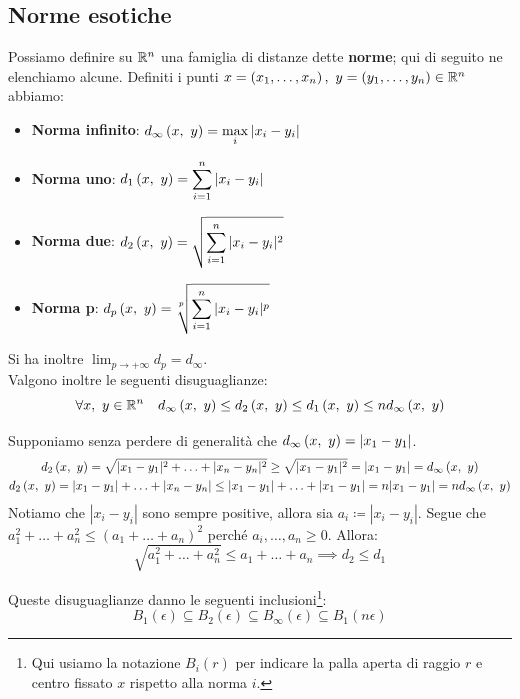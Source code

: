 \subsection{Norme esotiche}
Possiamo definire su $\mathbb{R}^n$ una famiglia di distanze dette \textbf{norme}; qui di seguito ne elenchiamo alcune. Definiti i punti $x=\left(x_1,\ldots, x_n\right),\ y=\left(y_1,\ldots, y_n\right)\in\realset^n$ abbiamo:
\begin{itemize}
\item \textbf{Norma infinito}: $\displaystyle d_\infty\left(x,\ y\right)=\max_{i}{|x_i-y_i|}$
\item \textbf{Norma uno}: $\displaystyle d_1\left(x,\ y\right)=\sum_{i=1}^{n}|x_i-y_i|$
\item \textbf{Norma due}: $\displaystyle d_2\left(x,\ y\right)=\sqrt{\sum_{i=1}^{n}|x_i-y_i|^2}$
\item \textbf{Norma p}: $\displaystyle\mvf{d_p}{x}{y}=\sqrt[\leftroot{1}\uproot{3}p]{\sum_{i=1}^{n}|x_i-y_i|^p}$
\end{itemize}
Si ha inoltre $\displaystyle \lim_{p \to +\infty}d_p=d_\infty$.\\
Valgono inoltre le seguenti disuguaglianze:
\begin{equation}
\forall x,\ y\in\mathbb{R}^n\quad d_\infty\left(x,\ y\right)\leq d_2\left(x,\ y\right)\leq d_1\left(x,\ y\right)\leq nd_\infty\left(x,\ y\right)
\end{equation}
\begin{demonstration}
Supponiamo senza perdere di generalità che $d_\infty\left(x,\ y\right)=|x_1-y_1|$.
\begin{gather*}
d_2\left(x,\ y\right)=\sqrt{|x_1-y_1|^2+\ldots+|x_n-y_n|^2}\geq\sqrt{|x_1-y_1|^2}=|x_1-y_1|=d_\infty\left(x,\ y\right)\\
d_2\left(x,\ y\right)=|x_1-y_1|+\ldots+|x_n-y_n|\leq|x_1-y_1|+\ldots+|x_1-y_1|=n|x_1-y_1|=nd_\infty\left(x,\ y\right)
\end{gather*}
Notiamo che $|x_i-y_i|$ sono sempre positive, allora sia $a_i\coloneqq|x_i-y_i|$. Segue che $a_1^2+\ldots+a_n^2\leq (a_1+\ldots+a_n)^2$ perché $a_i,\ldots,a_n\geq0$. Allora:
\begin{equation*}
\sqrt{a_1^2+\ldots+a_n^2}\leq a_1+\ldots+a_n\implies d_2\leq d_1
\end{equation*}
\end{demonstration}
Queste disuguaglianze danno le seguenti inclusioni\footnote{Qui usiamo la notazione $B_i\left(r\right)$ per indicare la palla aperta di raggio $r$ e centro fissato $x$ rispetto alla norma $i$.}:
\begin{equation}
B_1\left(\epsilon\right)\subseteq B_2\left(\epsilon\right)\subseteq B_\infty\left(\epsilon\right)\subseteq B_1\left(n\epsilon\right)
\end{equation}
